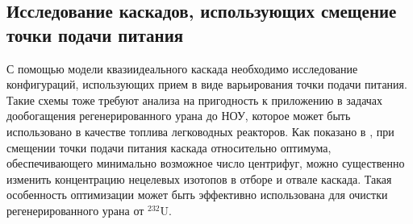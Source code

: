 \subsection{Исследование каскадов, использующих смещение точки подачи питания}
С помощью модели квазиидеального каскада необходимо исследование конфигураций, использующих прием в виде варьирования точки подачи питания. Такие схемы тоже требуют анализа на пригодность к приложению в задачах дообогащения регенерированного урана до НОУ, которое может быть использовано в качестве топлива легководных реакторов. Как показано в \cite{palk_2013}, при смещении точки подачи питания каскада относительно оптимума, обеспечивающего минимально возможное число центрифуг, можно существенно изменить концентрацию нецелевых изотопов в отборе и отвале каскада. Такая особенность оптимизации может быть эффективно использована для очистки регенерированного урана от $^{232}$U.